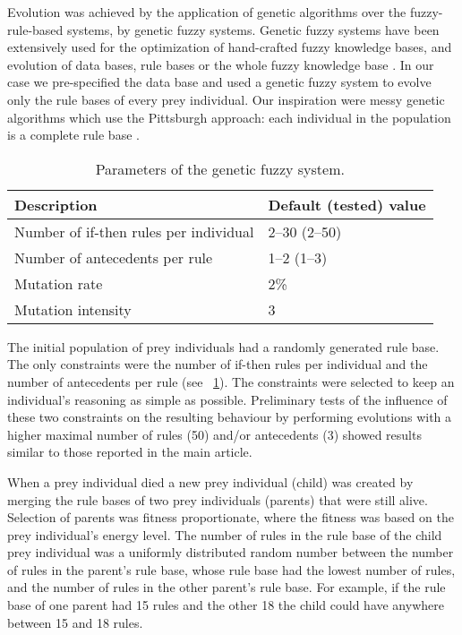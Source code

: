 Evolution was achieved by the application of genetic algorithms over the fuzzy-rule-based systems, \ie by genetic fuzzy systems. Genetic fuzzy systems have been extensively used for the optimization of hand-crafted fuzzy knowledge bases, and evolution of data bases, rule bases or the whole fuzzy knowledge base \cite{cordon2004ten,fernandez2015revisiting,herrera2008genetic}. In our case we pre-specified the data base and used a genetic fuzzy system to evolve only the rule bases of every prey individual. Our inspiration were messy genetic algorithms \cite{goldberg1989messy} which use the Pittsburgh approach: each individual in the population is a complete rule base \cite{hoffman1997evolutionary,smith1980learning}.

\begin{table}
  \caption{Parameters of the genetic fuzzy system.}
  \label{table:ga}
  \begin{tabular}{l l}
    \toprule
    Description & Default (tested) value \\ [0.5ex]
    \midrule
    Number of if-then rules per individual & 2--30 (2--50) \\
    Number of antecedents per rule & 1--2 (1--3) \\
    Mutation rate & 2\% \\
    Mutation intensity & 3 \\
    \bottomrule
  \end{tabular}
\end{table}

The initial population of prey individuals had a randomly generated rule base. The only constraints were the number of if-then rules per individual and the number of antecedents per rule (see \tablename~\ref{table:ga}). The constraints were selected to keep an individual's reasoning as simple as possible. Preliminary tests of the influence of these two constraints on the resulting behaviour by performing evolutions with a higher maximal number of rules (50) and/or antecedents (3) showed results similar to those reported in the main article.

When a prey individual died a new prey individual (child) was created by merging the rule bases of two prey individuals (parents) that were still alive. Selection of parents was fitness proportionate, where the fitness was based on the prey individual's energy level. The number of rules in the rule base of the child prey individual was a uniformly distributed random number between the number of rules in the parent's rule base, whose rule base had the lowest number of rules, and the number of rules in the other parent's rule base. For example, if the rule base of one parent had 15 rules and the other 18 the child could have anywhere between 15 and 18 rules.

